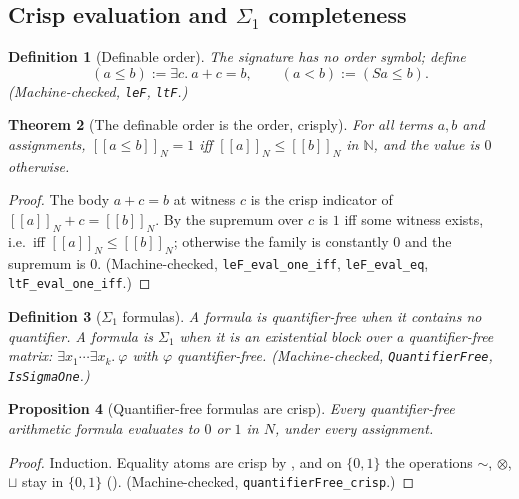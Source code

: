 \documentclass[11pt,a4paper]{article}
\newtheorem{theorem}{Theorem}[section]
\newtheorem{proposition}[theorem]{Proposition}
\newtheorem{definition}[theorem]{Definition}
\newcommand{\negc}{\mathord{\sim}}
\newcommand{\conjc}{\otimes}
\newcommand{\disjc}{\sqcup}
\newcommand{\Nat}{\mathbb{N}}
\newcommand{\evalc}[2]{[\![ {#2} ]\!]_{#1}}
\begin{document}
\subsection{Crisp evaluation and \texorpdfstring{$\Sigma_1$}{Sigma-1}
  completeness}

\begin{definition}[Definable order]
\label{def:leF}
The signature has no order symbol; define
\[
  (a \leq b) := \exists c.\ a + c = b,
  \qquad
  (a < b) := (Sa \leq b).
\]
(Machine-checked, \texttt{leF}, \texttt{ltF}.)
\end{definition}

\begin{theorem}[The definable order is the order, crisply]
\label{thm:leF}
For all terms $a, b$ and assignments,
$\evalc{N}{a \leq b} = 1$ iff
$\evalc{N}{a} \leq \evalc{N}{b}$ in $\Nat$, and the value is $0$
otherwise.
\end{theorem}
\begin{proof}
The body $a + c = b$ at witness $c$ is the crisp indicator of
$\evalc{N}{a} + c = \evalc{N}{b}$.
By  the supremum over $c$ is $1$ iff some witness
exists, i.e.\ iff $\evalc{N}{a} \leq \evalc{N}{b}$; otherwise the
family is constantly $0$ and the supremum is $0$.
(Machine-checked, \texttt{leF\_eval\_one\_iff},
\texttt{leF\_eval\_eq}, \texttt{ltF\_eval\_one\_iff}.)
\end{proof}

\begin{definition}[$\Sigma_1$ formulas]
\label{def:sigma1}
A formula is \emph{quantifier-free} when it contains no quantifier.
A formula is $\Sigma_1$ when it is an existential block over a
quantifier-free matrix:
$\exists x_1 \cdots \exists x_k.\ \varphi$ with $\varphi$
quantifier-free.
(Machine-checked, \texttt{QuantifierFree}, \texttt{IsSigmaOne}.)
\end{definition}

\begin{proposition}[Quantifier-free formulas are crisp]
\label{prop:qf-crisp}
Every quantifier-free arithmetic formula evaluates to $0$ or $1$ in
$N$, under every assignment.
\end{proposition}
\begin{proof}
Induction.
Equality atoms are crisp by , and on $\{0,1\}$ the
operations $\negc$, $\conjc$, $\disjc$ stay in $\{0,1\}$
().
(Machine-checked, \texttt{quantifierFree\_crisp}.)
\end{proof}
\end{document}
